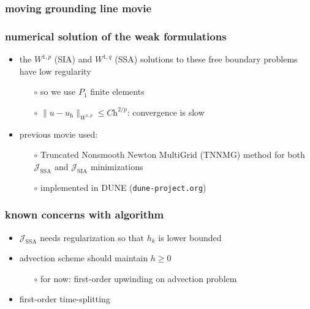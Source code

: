 \documentclass{beamer}
\begin{document}
\begin{frame}
  \frametitle{moving grounding line movie}

\begin{center}
\end{center}
\end{frame}


\begin{frame}
  \frametitle{numerical solution of the weak formulations}

\begin{itemize}
\item the $W^{1,p}$ (SIA) and $W^{1,q}$ (SSA) solutions to these free boundary problems have low regularity
  \begin{itemize}
  \item[$\circ$] so we use $P_1$ finite elements
  \item[$\circ$] $\|u-u_{\text{h}}\|_{W^{1,p}} \le C \text{h}^{2/p}$: convergence is slow
  \end{itemize}

\bigskip
\item previous movie used:
  \begin{itemize}
  \item[$\circ$] Truncated Nonsmooth Newton MultiGrid (TNNMG) method for both $\mathcal{J}_{\text{SSA}}$ and $\mathcal{J}_{\text{SIA}}$ minimizations
  \item[$\circ$] implemented in DUNE (\texttt{dune-project.org})
  \end{itemize}
\end{itemize}
\end{frame}


\begin{frame}
  \frametitle{known concerns with algorithm}

\begin{itemize}
\item $\mathcal{J}_{\text{SSA}}$ needs regularization so that $h_k$ is lower bounded
\item advection scheme should maintain $h\ge 0$
  \begin{itemize}
  \item[$\circ$] for now: first-order upwinding on advection problem
  \end{itemize}
\item first-order time-splitting 
\end{itemize}
\end{frame}
\end{document}
